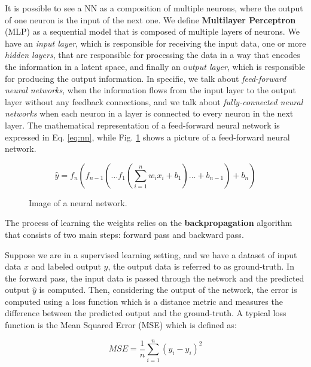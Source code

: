 It is possible to see a NN as a composition of multiple neurons, where the output of one neuron is the input of the next one.
We define \textbf{Multilayer Perceptron} (MLP) as a sequential model that is composed of multiple layers of neurons.
We have an \textit{input layer}, which is responsible for receiving the input data, one or more \textit{hidden layers}, that are responsible for processing the data in a way that encodes the information in a latent space, and finally an o\textit{utput layer}, which is responsible for producing the output information.
In specific, we talk about \textit{feed-forward neural networks}, when the information flows from the input layer to the output layer without any feedback connections, and we talk about \textit{fully-connected neural networks} when each neuron in a layer is connected to every neuron in the next layer.
The mathematical representation of a feed-forward neural network is expressed in Eq. \ref{eq:nn}, while Fig. \ref{fig:nn} shows a picture of a feed-forward neural network.


\begin{equation}
    \hat{y} = f_n(f_{n-1}(\dots f_1(\sum_{i=1}^{n} w_i x_i + b_1) \dots + b_{n-1}) + b_n)
    \label{eq:nn}
\end{equation}


\begin{figure}[ht]
    \begin{center}
        \fbox{\rule[-.5cm]{0cm}{4cm} \rule[-.5cm]{4cm}{0cm}}
    \end{center}
    \caption{Image of a neural network.}
    \label{fig:nn}
\end{figure}


The process of learning the weights relies on the \textbf{backpropagation} algorithm \citep{rumelhart1986learning} that consists of two main steps: forward pass and backward pass.

Suppose we are in a supervised learning setting, and we have a dataset of input data $x$ and labeled output $y$, the output data is referred to as ground-truth.
In the forward pass, the input data is passed through the network and the predicted output $\hat{y}$ is computed.
Then, considering the output of the network, the error is computed using a loss function which is a distance metric and measures the difference between the predicted output and the ground-truth.
A typical loss function is the Mean Squared Error (MSE) which is defined as:

\begin{equation}
    MSE = \frac{1}{n} \sum_{i=1}^{n} (y_i - \hat{y}_i)^2
\end{equation}

